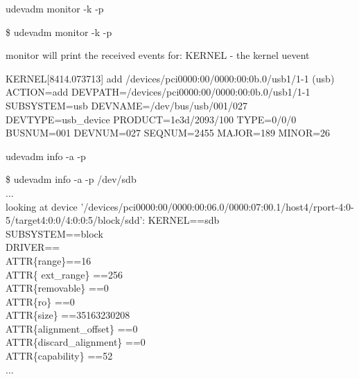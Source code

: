 \documentclass{beamer}
\begin{document}
\begin{frame}
\begin{exampleblock}{udevadm monitor -k -p} 
	
	\tiny{\$  udevadm monitor -k -p
		
		monitor will print the received events for:
		KERNEL - the kernel uevent
		
		KERNEL[8414.073713] add      /devices/pci0000:00/0000:00:0b.0/usb1/1-1 (usb)\newline
		ACTION=add\newline
		DEVPATH=/devices/pci0000:00/0000:00:0b.0/usb1/1-1\newline
		SUBSYSTEM=usb\newline
		DEVNAME=/dev/bus/usb/001/027\newline
		DEVTYPE=usb\_device\newline
		PRODUCT=1e3d/2093/100\newline
		TYPE=0/0/0\newline
		BUSNUM=001\newline
		DEVNUM=027\newline
		SEQNUM=2455\newline
		MAJOR=189\newline
		MINOR=26\newline}
\end{exampleblock}
 
\end{frame}

\begin{frame}
\begin{exampleblock}{udevadm info -a -p} 

\tiny{\$  udevadm info -a -p /dev/sdb\\
...\\
looking at device '/devices/pci0000:00/0000:00:06.0/0000:07:00.1/host4/rport-4:0-5/target4:0:0/4:0:0:5/block/sdd':
KERNEL==sdb\\    
    SUBSYSTEM==block\\
    DRIVER==\\

	
  ATTR\{range\}==16\\
 ATTR\{ ext\_range\} ==256\\
    ATTR\{removable\} ==0\\
    ATTR\{ro\} ==0\\
    ATTR\{size\} ==35163230208\\
    ATTR\{alignment\_offset\} ==0\\
    ATTR\{discard\_alignment\} ==0\\
    ATTR\{capability\} ==52\\
...
}

		
		
\end{exampleblock}
 
\end{frame}
\end{document}
